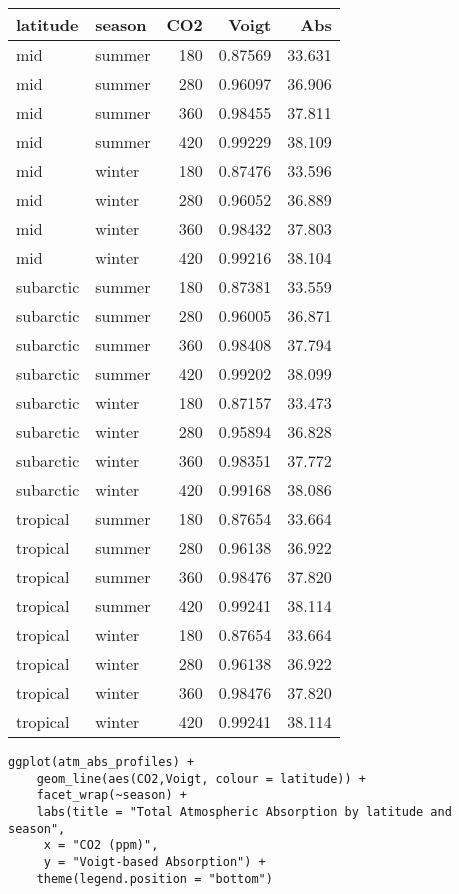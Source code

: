 \documentclass[10pt,a4paper,titlepage]{article}
\begin{document}
\begin{center}
\begin{tabular}{llrrr}
\toprule
latitude & season & CO2 & Voigt & Abs\\
\midrule
mid & summer & 180 & 0.87569 & 33.631\\
mid & summer & 280 & 0.96097 & 36.906\\
mid & summer & 360 & 0.98455 & 37.811\\
mid & summer & 420 & 0.99229 & 38.109\\
mid & winter & 180 & 0.87476 & 33.596\\
mid & winter & 280 & 0.96052 & 36.889\\
mid & winter & 360 & 0.98432 & 37.803\\
mid & winter & 420 & 0.99216 & 38.104\\
subarctic & summer & 180 & 0.87381 & 33.559\\
subarctic & summer & 280 & 0.96005 & 36.871\\
subarctic & summer & 360 & 0.98408 & 37.794\\
subarctic & summer & 420 & 0.99202 & 38.099\\
subarctic & winter & 180 & 0.87157 & 33.473\\
subarctic & winter & 280 & 0.95894 & 36.828\\
subarctic & winter & 360 & 0.98351 & 37.772\\
subarctic & winter & 420 & 0.99168 & 38.086\\
tropical & summer & 180 & 0.87654 & 33.664\\
tropical & summer & 280 & 0.96138 & 36.922\\
tropical & summer & 360 & 0.98476 & 37.820\\
tropical & summer & 420 & 0.99241 & 38.114\\
tropical & winter & 180 & 0.87654 & 33.664\\
tropical & winter & 280 & 0.96138 & 36.922\\
tropical & winter & 360 & 0.98476 & 37.820\\
tropical & winter & 420 & 0.99241 & 38.114\\
\bottomrule
\end{tabular}
\end{center}

\begin{lstlisting}
ggplot(atm_abs_profiles) +
    geom_line(aes(CO2,Voigt, colour = latitude)) +
    facet_wrap(~season) +
    labs(title = "Total Atmospheric Absorption by latitude and season",
	 x = "CO2 (ppm)",
	 y = "Voigt-based Absorption") +
    theme(legend.position = "bottom")
\end{lstlisting}
\end{document}
